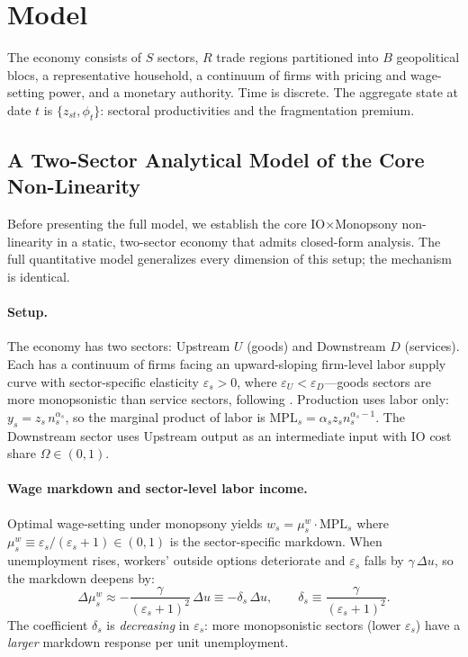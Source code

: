 \section{Model}
\label{sec:model}

The economy consists of $S$ sectors, $R$ trade regions partitioned into
$B$ geopolitical blocs, a representative household, a continuum of firms
with pricing and wage-setting power, and a monetary authority.
Time is discrete. The aggregate state at date $t$ is
$\{z_{st}, \phi_t\}$: sectoral productivities and the fragmentation premium.

\subsection{A Two-Sector Analytical Model of the Core Non-Linearity}
\label{sec:toy_model}

Before presenting the full model, we establish the core
IO$\times$Monopsony non-linearity in a static, two-sector economy that
admits closed-form analysis. The full quantitative model generalizes every
dimension of this setup; the mechanism is identical.

\paragraph{Setup.}
The economy has two sectors: Upstream $U$ (goods) and Downstream $D$
(services). Each has a continuum of firms facing an upward-sloping
firm-level labor supply curve with sector-specific elasticity
$\varepsilon_s > 0$, where $\varepsilon_U < \varepsilon_D$---goods sectors
are more monopsonistic than service sectors, following
\citet{dube2020monopsony}. Production uses labor only:
$y_s = z_s\,n_s^{\alpha_s}$, so the marginal product of labor is
$\mathrm{MPL}_s = \alpha_s z_s n_s^{\alpha_s-1}$. The Downstream sector
uses Upstream output as an intermediate input with IO cost share
$\Omega \in (0,1)$.

\paragraph{Wage markdown and sector-level labor income.}
Optimal wage-setting under monopsony yields
$w_s = \mu_s^w \cdot \mathrm{MPL}_s$ where $\mu_s^w \equiv
\varepsilon_s/(\varepsilon_s+1) \in (0,1)$ is the sector-specific markdown.
When unemployment rises, workers' outside options deteriorate and
$\varepsilon_s$ falls by $\gamma\,\Delta u$, so the markdown deepens by:
\begin{equation}
  \Delta\mu_s^w \approx -\frac{\gamma}{(\varepsilon_s+1)^2}\,\Delta u
  \equiv -\delta_s\,\Delta u, \qquad \delta_s \equiv
  \frac{\gamma}{(\varepsilon_s+1)^2}.
  \label{eq:delta_s}
\end{equation}
The coefficient $\delta_s$ is \emph{decreasing} in $\varepsilon_s$: more
monopsonistic sectors (lower $\varepsilon_s$) have a \emph{larger}
markdown response per unit unemployment.

